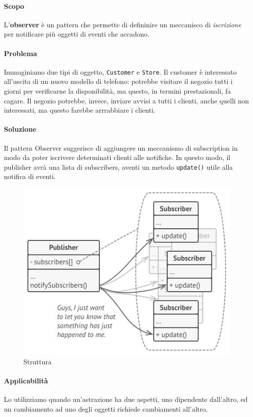 \documentclass[11pt]{article}
\newcommand{\code}[1]{\texttt{#1}}
\begin{document}
\paragraph{Scopo}
L'\textbf{observer} è un pattern che permette di defininire un meccanisco di \textit{iscrizione} per notificare più oggetti di eventi che accadono.
\paragraph{Problema}
Immaginiamo due tipi di oggetto, \code{Customer} e \code{Store}. Il customer è interessato all'uscita di un nuovo modello di telefono: potrebbe visitare il negozio tutti i giorni per verificarne la disponibilità, ma questo, in termini prestazionali, fa cagare.
Il negozio potrebbe, invece, inviare avvisi a tutti i clienti, anche quelli non interessati, ma questo farebbe arrrabbiare i clienti.
\paragraph{Soluzione}
Il pattern Observer suggerisce di aggiungere un meccanismo di subscription in modo da poter iscrivere determinati clienti alle notifiche. In questo modo, il publisher avrà una lista di subscribers, aventi un metodo \code{update()} utile alla notifica di eventi. 
\begin{figure}[H]
    \includegraphics[width=\linewidth]{res/teoria/Observer.png}
    \caption{Struttura}
\end{figure}
\paragraph{Applicabilità}
Lo utilizziamo quando un'astrazione ha due aspetti, uno dipendente dall'altro, ed un cambiamento ad uno degli oggetti richiede cambiamenti all'altro. 
\end{document}
